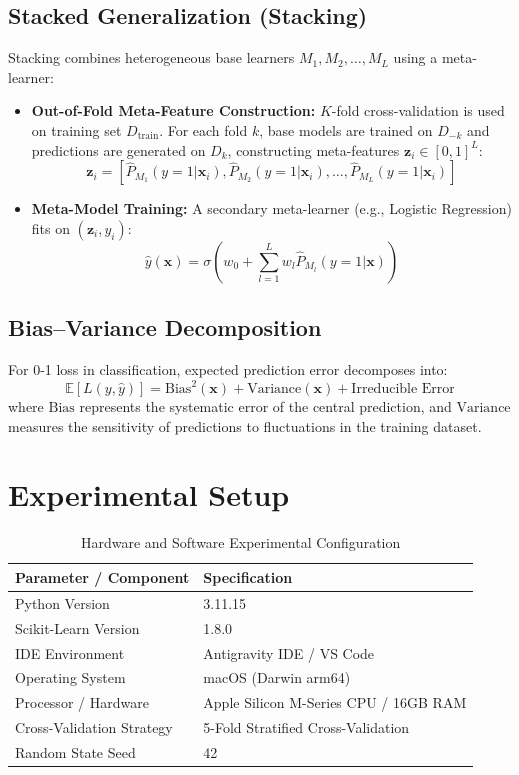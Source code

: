 \documentclass[12pt,a4paper]{article}
\begin{document}
\subsection{Stacked Generalization (Stacking)}
Stacking combines heterogeneous base learners $M_1, M_2, \dots, M_L$ using a meta-learner:
\begin{itemize}
\item \textbf{Out-of-Fold Meta-Feature Construction:} $K$-fold cross-validation is used on training set $D_{\text{train}}$. For each fold $k$, base models are trained on $D_{-k}$ and predictions are generated on $D_k$, constructing meta-features $\mathbf{z}_i \in [0, 1]^L$:
\begin{equation}
\mathbf{z}_i = \left[ \hat{P}_{M_1}(y=1|\mathbf{x}_i), \hat{P}_{M_2}(y=1|\mathbf{x}_i), \dots, \hat{P}_{M_L}(y=1|\mathbf{x}_i) \right]
\end{equation}
\item \textbf{Meta-Model Training:} A secondary meta-learner (e.g., Logistic Regression) fits on $(\mathbf{z}_i, y_i)$:
\begin{equation}
\hat{y}(\mathbf{x}) = \sigma\left( w_0 + \sum_{l=1}^L w_l \hat{P}_{M_l}(y=1|\mathbf{x}) \right)
\end{equation}
\end{itemize}

\subsection{Bias–Variance Decomposition}
For 0-1 loss in classification, expected prediction error decomposes into:
\begin{equation}
\mathbb{E}[L(y, \hat{y})] = \text{Bias}^2(\mathbf{x}) + \text{Variance}(\mathbf{x}) + \text{Irreducible Error}
\end{equation}
where $\text{Bias}$ represents the systematic error of the central prediction, and $\text{Variance}$ measures the sensitivity of predictions to fluctuations in the training dataset.

\section{Experimental Setup}
\begin{table}[H]
\centering
\begin{tabular}{ll}
\toprule
\textbf{Parameter / Component} & \textbf{Specification} \\
\midrule
Python Version & 3.11.15 \\
Scikit-Learn Version & 1.8.0 \\
IDE Environment & Antigravity IDE / VS Code \\
Operating System & macOS (Darwin arm64) \\
Processor / Hardware & Apple Silicon M-Series CPU / 16GB RAM \\
Cross-Validation Strategy & 5-Fold Stratified Cross-Validation \\
Random State Seed & 42 \\
\bottomrule
\end{tabular}
\caption{Hardware and Software Experimental Configuration}
\end{table}
\end{document}
